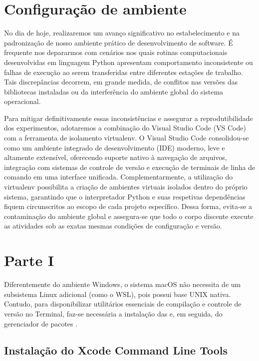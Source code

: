 

\section*{Configuração de ambiente}

No dia de hoje, realizaremos um avanço significativo no estabelecimento e na padronização de nosso ambiente prático de desenvolvimento de software. É frequente nos depararmos com cenários nos quais rotinas computacionais desenvolvidas em linguagem Python apresentam comportamento inconsistente ou falhas de execução ao serem transferidas entre diferentes estações de trabalho. Tais discrepâncias decorrem, em grande medida, de conflitos nas versões das bibliotecas instaladas ou da interferência do ambiente global do sistema operacional.

Para mitigar definitivamente essas inconsistências e assegurar a reprodutibilidade dos experimentos, adotaremos a combinação do Visual Studio Code (VS Code) com a ferramenta de isolamento virtualenv. O Visual Studio Code consolidou-se como um ambiente integrado de desenvolvimento (IDE) moderno, leve e altamente extensível, oferecendo suporte nativo à navegação de arquivos, integração com sistemas de controle de versão e execução de terminais de linha de comando em uma interface unificada.
Complementarmente, a utilização do virtualenv possibilita a criação de ambientes virtuais isolados dentro do próprio sistema, garantindo que o interpretador Python e suas respetivas dependências fiquem circunscritos ao escopo de cada projeto específico. Dessa forma, evita-se a contaminação do ambiente global e assegura-se que todo o corpo discente execute as atividades sob as exatas mesmas condições de configuração e versão.

\section*{Parte I}


Diferentemente do ambiente Windows, o sistema macOS não necessita de um subsistema Linux adicional (como o WSL), pois possui base UNIX nativa. Contudo, para disponibilizar utilitários essenciais de compilação e controle de versão no Terminal, faz-se necessária a instalação das  e, em seguida, do gerenciador de pacotes .

\subsection*{Instalação do Xcode Command Line Tools}

